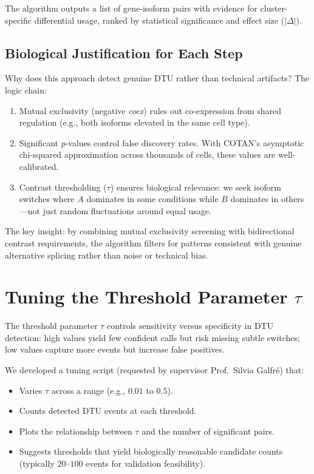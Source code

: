 The algorithm outputs a list of gene-isoform pairs with evidence for cluster-specific differential usage, ranked by statistical significance and effect size ($|\Delta|$).

\subsection*{Biological Justification for Each Step}

Why does this approach detect genuine DTU rather than technical artifacts? The logic chain:

\begin{enumerate}
    \item Mutual exclusivity (negative \textit{coex}) rules out co-expression from shared regulation (e.g., both isoforms elevated in the same cell type).
    \item Significant $p$-values control false discovery rates. With COTAN's asymptotic chi-squared approximation across thousands of cells, these values are well-calibrated.
    \item Contrast thresholding ($\tau$) ensures biological relevance: we seek isoform switches where $A$ dominates in some conditions while $B$ dominates in others---not just random fluctuations around equal usage.
\end{enumerate}

The key insight: by combining mutual exclusivity screening with bidirectional contrast requirements, the algorithm filters for patterns consistent with genuine alternative splicing rather than noise or technical bias.

\section{Tuning the Threshold Parameter \texorpdfstring{$\tau$}{tau}}\label{sec:tuning-tau}

The threshold parameter $\tau$ controls sensitivity versus specificity in DTU detection: high values yield few confident calls but risk missing subtle switches; low values capture more events but increase false positives.

We developed a tuning script (requested by supervisor Prof.\ Silvia Galfr\'e) that:

\begin{itemize}
    \item Varies $\tau$ across a range (e.g., $0.01$ to $0.5$).
    \item Counts detected DTU events at each threshold.
    \item Plots the relationship between $\tau$ and the number of significant pairs.
    \item Suggests thresholds that yield biologically reasonable candidate counts (typically $20$--$100$ events for validation feasibility).
\end{itemize}

